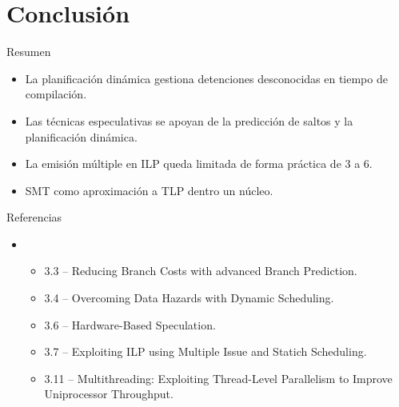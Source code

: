 \section{Conclusión}

\begin{frame}[t]{Resumen}
\begin{itemize}[<+->]
  \item La planificación dinámica gestiona detenciones desconocidas en tiempo de compilación.
  
  \item Las técnicas especulativas se apoyan de la predicción de saltos y la planificación dinámica.
  
  \item La emisión múltiple en ILP queda limitada de forma práctica de 3 a 6.
  
  \item SMT como aproximación a TLP dentro un núcleo.
\end{itemize}
\end{frame}


\begin{frame}[t]{Referencias}
\begin{itemize}
  \item \bibhennessy
    \begin{itemize}
      \item 3.3 -- Reducing Branch Costs with advanced Branch Prediction.
      \item 3.4 -- Overcoming Data Hazards with Dynamic Scheduling.
      \item 3.6 -- Hardware-Based Speculation.
      \item 3.7 -- Exploiting ILP using Multiple Issue and Statich Scheduling.
      \item 3.11 -- Multithreading: Exploiting Thread-Level Parallelism to 
            Improve Uniprocessor Throughput.
    \end{itemize}
\end{itemize}
\end{frame}
